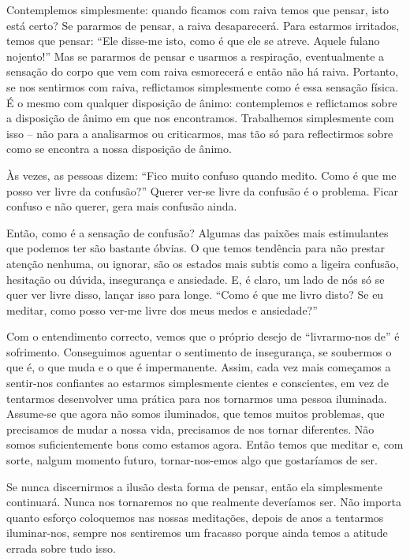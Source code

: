 Contemplemos simplesmente: quando ficamos com raiva temos que pensar, isto está
certo? Se pararmos de pensar, a raiva desaparecerá. Para estarmos irritados,
temos que pensar: ``Ele disse-me isto, como é que ele se atreve. Aquele fulano
nojento!'' Mas se pararmos de pensar e usarmos a respiração, eventualmente a
sensação do corpo que vem com raiva esmorecerá e então não há raiva. Portanto,
se nos sentirmos com raiva, reflictamos simplesmente como é essa sensação
física. É o mesmo com qualquer disposição de ânimo: contemplemos e reflictamos
sobre a disposição de ânimo em que nos encontramos. Trabalhemos simplesmente com
isso -- não para a analisarmos ou criticarmos, mas tão só para reflectirmos
sobre como se encontra a nossa disposição de ânimo.

Às vezes, as pessoas dizem: ``Fico muito confuso quando medito. Como é que me
posso ver livre da confusão?'' Querer ver-se livre da confusão é o problema.
Ficar confuso e não querer, gera mais confusão ainda.

Então, como é a sensação de confusão? Algumas das paixões mais estimulantes que
podemos ter são bastante óbvias. O que temos tendência para não prestar atenção
nenhuma, ou ignorar, são os estados mais subtis como a ligeira confusão,
hesitação ou dúvida, insegurança e ansiedade. E, é claro, um lado de nós só se
quer ver livre disso, lançar isso para longe. ``Como é que me livro disto? Se eu
meditar, como posso ver-me livre dos meus medos e ansiedade?''

Com o entendimento correcto, vemos que o próprio desejo de ``livrarmo-nos de'' é
sofrimento. Conseguimos aguentar o sentimento de insegurança, se soubermos o que
é, o que muda e o que é impermanente. Assim, cada vez mais começamos a
sentir-nos confiantes ao estarmos simplesmente cientes e conscientes, em vez de
tentarmos desenvolver uma prática para nos tornarmos uma pessoa iluminada.
Assume-se que agora não somos iluminados, que temos muitos problemas, que
precisamos de mudar a nossa vida, precisamos de nos tornar diferentes. Não somos
suficientemente bons como estamos agora. Então temos que meditar e, com sorte,
nalgum momento futuro, tornar-nos-emos algo que gostaríamos de ser.

Se nunca discernirmos a ilusão desta forma de pensar, então ela simplesmente
continuará. Nunca nos tornaremos no que realmente deveríamos ser. Não importa
quanto esforço coloquemos nas nossas meditações, depois de anos a tentarmos
iluminar-nos, sempre nos sentiremos um fracasso porque ainda temos a atitude
errada sobre tudo isso.

